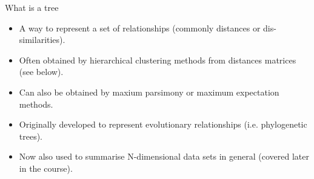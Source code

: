 \documentclass[pdf]{beamer}
\begin{document}
\begin{frame}{What is a tree}
  \begin{itemize}
  \item A way to represent a set of relationships (commonly distances or dis-similarities).
  \item Often obtained by hierarchical clustering methods from distances matrices (see below).
  \item Can also be obtained by maxium parsimony or maximum expectation methods.
  \item Originally developed to represent evolutionary relationships (i.e. phylogenetic trees).
  \item Now also used to summarise N-dimensional data sets in general (covered later in the course).
  \end{itemize}
\end{frame}
\end{document}
